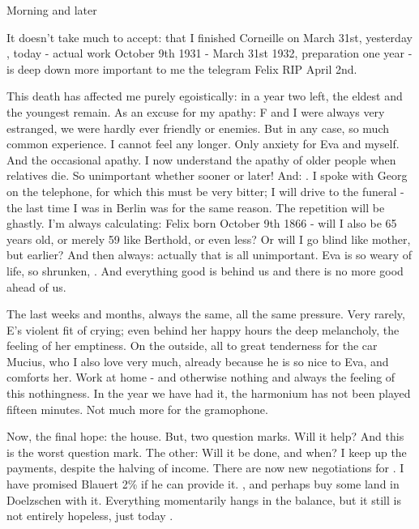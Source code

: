 Morning and later

It doesn't take much to accept: that I finished Corneille on March 31st, yesterday , today  - actual work October 9th 1931 - March 31st 1932, preparation one year - is deep down more important to me the telegram Felix RIP April 2nd.

This death has affected me purely egoistically: in a year two left, the eldest and the youngest remain. As an excuse for my apathy: F and I were always very estranged, we were hardly ever friendly or enemies. But in any case, so much common experience. I cannot feel any longer. Only anxiety for Eva and myself. And the occasional apathy. I now understand the apathy of older people when relatives die.  So unimportant whether sooner or later! And: . 
I spoke with Georg on the telephone, for which this must be very bitter; I will drive to the funeral - the last time I was in Berlin was for the same reason. The repetition will be ghastly. I'm always calculating: Felix born October 9th 1866 - will I also be 65 years old, or merely 59 like Berthold, or even less? Or will I go blind like mother, but earlier? And then always: actually that is all unimportant. Eva is so weary of life, so shrunken, . And everything good is behind us and there is no more good ahead of us.

The last weeks and months, always the same, all the same pressure. Very rarely, E's violent fit of crying; even behind her happy hours the deep melancholy, the feeling of her emptiness. On the outside, all to great tenderness for the car Mucius, who I also love very much, already because he is so nice to Eva, and comforts her. Work at home - and otherwise nothing and always the feeling of this nothingness. In the year we have had it, the harmonium has not been played fifteen minutes. Not much more for the gramophone.

\missing

Now, the final hope: the house. But, two question marks. Will it help? And this is the worst question mark. The other: Will it be done, and when? I keep up the payments, despite the halving of income. There are now new negotiations for . I have promised Blauert 2\% if he can provide it. , and perhaps buy some land in Doelzschen with it. Everything momentarily hangs in the balance, but it still is not entirely hopeless, just today .

